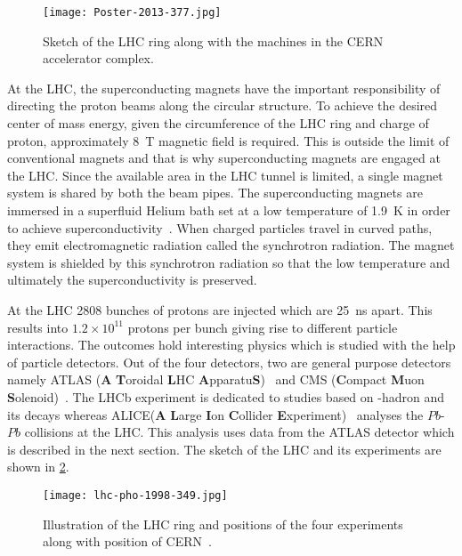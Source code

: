 \begin{figure}[htbp]
    \centering
    \texttt{[image: Poster-2013-377.jpg]}
    \caption[Sketch of the CERN accelerator complex]{Sketch of the LHC ring along with the machines in the CERN accelerator complex\cite{Haffner:1621894}.}%
    \label{fig:acc_complex}
\end{figure}

At the LHC, the superconducting magnets have the important responsibility of directing the proton beams 
along the circular structure. To achieve the desired center of mass energy, 
given the circumference of the LHC ring and charge of proton, approximately \SI{8}{\tesla} magnetic field is 
required. This is outside the limit of conventional magnets and that is why superconducting magnets are 
engaged at the LHC. Since the 
available area in the LHC tunnel is limited, a single magnet system is shared by both the beam pipes. The 
superconducting magnets are immersed in a superfluid Helium bath set at 
a low temperature of \SI{1.9}{\kelvin} in order to achieve superconductivity~\cite{Rossi:630341}. 
When charged particles travel in curved paths, they emit electromagnetic radiation called the 
synchrotron radiation. The magnet system is shielded by this synchrotron radiation so that the low
temperature and ultimately the superconductivity is preserved. 

At the LHC 2808 bunches of protons are injected which are \SI{25}{\ns} apart. This results into 
$1.2 \times 10^{11}$ protons per bunch giving rise to different particle interactions. 
The outcomes hold interesting physics which is studied with the help of particle detectors. 
Out of the four detectors, two are general purpose detectors namely ATLAS (\textbf{A} \textbf{T}oroidal \textbf{L}HC \textbf{A}pparatu\textbf{S})~\cite{TheATLASCollaboration_2008} and
CMS (\textbf{C}ompact \textbf{M}uon \textbf{S}olenoid)~\cite{TheCMSCollaboration_2008}. The LHCb experiment\cite{TheLHCbCollaboration_2008} is dedicated to 
studies based on \PB-hadron and its decays whereas ALICE(\textbf{A} \textbf{L}arge \textbf{I}on \textbf{C}ollider \textbf{E}xperiment)~\cite{TheALICECollaboration_2008}
analyses the $Pb$-$Pb$ collisions at the LHC. This analysis uses data from the ATLAS detector
which is described in the next section. The sketch of 
the LHC and its experiments are shown in \cref{fig:lhc}.


\begin{figure}[htbp]
    \centering
    \texttt{[image: lhc-pho-1998-349.jpg]}
    \caption[LHC and its experiments]{Illustration of the LHC ring and positions of the 
    four experiments along with position of CERN~\cite{Jean-Luc:841555}.}%
    \label{fig:lhc}
\end{figure}

